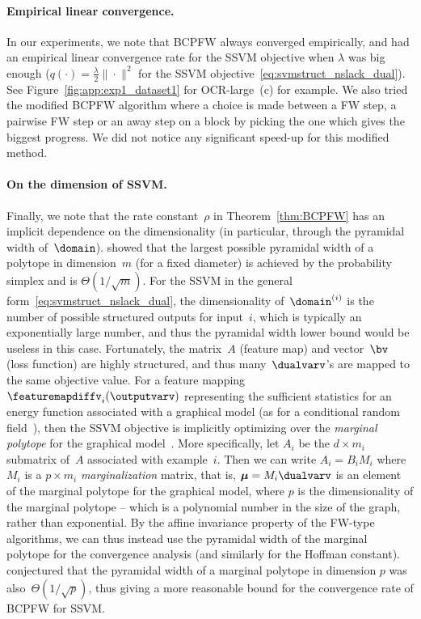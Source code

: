 \documentclass{article}
\begin{document}
\paragraph{Empirical linear convergence.} In our experiments, we note that BCPFW always converged empirically, and had an empirical linear convergence rate for the SSVM objective when $\lambda$ was big enough ($q(\cdot) = \frac{\lambda}{2} \| \cdot \|^2$ for the SSVM objective~\eqref{eq:svmstruct_nslack_dual}). See Figure~\ref{fig:app:exp1_dataset1} for OCR-large~(c) for example. We also tried the modified BCPFW algorithm where a choice is made between a FW step, a pairwise FW step or an away step on a block by picking the one which gives the biggest progress. We did not notice any significant speed-up for this modified method.

\paragraph{On the dimension of SSVM.} Finally, we note that the rate constant~$\rho$ in Theorem~\ref{thm:BCPFW} has an implicit dependence on the dimensionality (in particular, through the pyramidal width of~$\domain$). \citet{LacosteJulien2015linearFW} showed that the largest possible pyramidal width of a polytope in dimension~$m$ (for a fixed diameter) is achieved by the probability simplex and is $\Theta(1/\sqrt{m})$. For the SSVM in the general form~\eqref{eq:svmstruct_nslack_dual}, the dimensionality of~$\domain^{(i)}$ is the number of possible structured outputs for input~$i$, which is typically an exponentially large number, and thus the pyramidal width lower bound would be useless in this case. Fortunately, the matrix~$A$ (feature map) and vector~$\bv$ (loss function) are highly structured, and thus many~$\dualvarv$'s are mapped to the same objective value. For a feature mapping~$\featuremapdiffv_i(\outputvarv)$ representing the sufficient statistics for an energy function associated with a graphical model (as for a conditional random field~), then the SSVM objective is implicitly optimizing over the \emph{marginal polytope} for the graphical model~. More specifically, let $A_i$ be the $d \times m_i$ submatrix of~$A$ associated with example~$i$. Then we can write $A_i = B_i M_i$ where $M_i$ is a $p \times m_i$ \emph{marginalization} matrix, that is, $\bm{\mu} = M_i \dualvarv$ is an element of the marginal polytope for the graphical model, where $p$ is the dimensionality of the marginal polytope -- which is a polynomial number in the size of the graph, rather than exponential. By the affine invariance property of the FW-type algorithms, we can thus instead use the pyramidal width of the marginal polytope for the convergence analysis (and similarly for the Hoffman constant). \citet{LacosteJulien2015linearFW} conjectured that the pyramidal width of a marginal polytope in dimension $p$ was also~$\Theta(1/\sqrt{p})$, thus giving a more reasonable bound for the convergence rate of BCPFW for SSVM.
\end{document}
